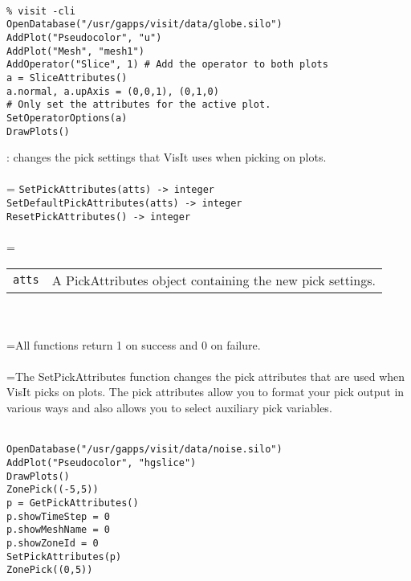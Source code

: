 \documentclass[10pt,a4paper]{report}
\begin{document}
\\[-6mm]
\begin{verbatim}% visit -cli
OpenDatabase("/usr/gapps/visit/data/globe.silo")
AddPlot("Pseudocolor", "u")
AddPlot("Mesh", "mesh1")
AddOperator("Slice", 1) # Add the operator to both plots
a = SliceAttributes()
a.normal, a.upAxis = (0,0,1), (0,1,0)
# Only set the attributes for the active plot.
SetOperatorOptions(a)
DrawPlots()
\end{verbatim}
\newpage


{}
: changes the pick settings that VisIt uses when picking on plots.\\[-3mm]

 \\ 
\hangindent=\parindent 
\verb!SetPickAttributes(atts) -> integer!\\ 
\verb!SetDefaultPickAttributes(atts) -> integer!\\ 
\verb!ResetPickAttributes() -> integer!\\ [-3mm]

 \\ 
\hangindent=\parindent 
\begin{tabular}{lp{9cm}}
\verb!atts! & A PickAttributes object containing the new pick settings. \\
\end{tabular} \\[-2mm]


 \\ 
\hangindent=\parindent All functions return 1 on success and 0 on failure. \\[-3mm] 

 \\ 
\hangindent=\parindent The SetPickAttributes function changes the pick attributes that are used when VisIt picks on plots. The pick attributes allow you to format your pick output in various ways and also allows you to select auxiliary pick variables. \\[-3mm] 

\\[-6mm]
\begin{verbatim}OpenDatabase("/usr/gapps/visit/data/noise.silo")
AddPlot("Pseudocolor", "hgslice")
DrawPlots()
ZonePick((-5,5))
p = GetPickAttributes()
p.showTimeStep = 0
p.showMeshName = 0
p.showZoneId = 0
SetPickAttributes(p)
ZonePick((0,5))
\end{verbatim}
\newpage
\end{document}
